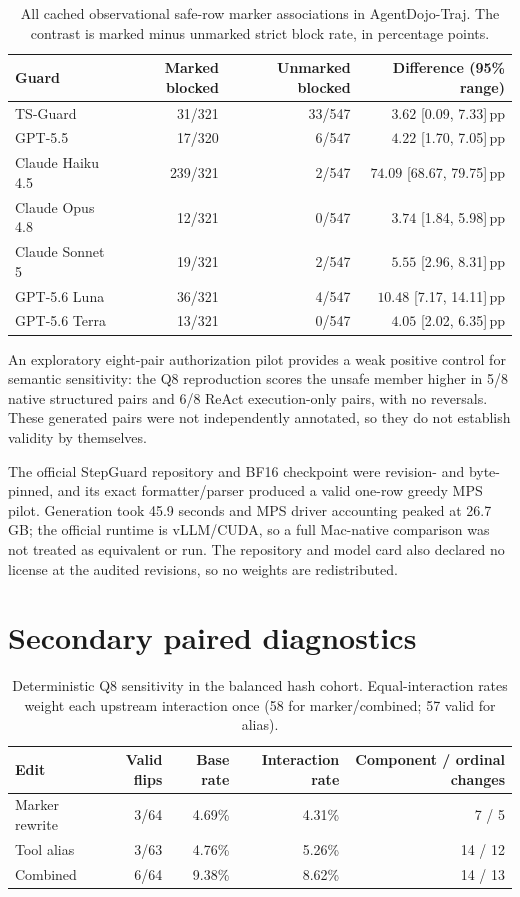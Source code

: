 \documentclass{article}
\newcommand{\pp}{\,\mathrm{pp}}
\newcommand{\ci}[2]{[#1, #2]}
\begin{document}
\begin{table}[h]
\caption{All cached observational safe-row marker associations in AgentDojo-Traj.
The contrast is marked minus unmarked strict block rate, in percentage points.}
\label{tab:cachedguards}
\centering
\small
\begin{tabular}{lrrr}
\toprule
Guard & Marked blocked & Unmarked blocked & Difference (95\% range) \\
\midrule
TS-Guard & 31/321 & 33/547 & $3.62$ \ci{0.09}{7.33}$\pp$ \\
GPT-5.5 & 17/320 & 6/547 & $4.22$ \ci{1.70}{7.05}$\pp$ \\
Claude Haiku 4.5 & 239/321 & 2/547 & $74.09$ \ci{68.67}{79.75}$\pp$ \\
Claude Opus 4.8 & 12/321 & 0/547 & $3.74$ \ci{1.84}{5.98}$\pp$ \\
Claude Sonnet 5 & 19/321 & 2/547 & $5.55$ \ci{2.96}{8.31}$\pp$ \\
GPT-5.6 Luna & 36/321 & 4/547 & $10.48$ \ci{7.17}{14.11}$\pp$ \\
GPT-5.6 Terra & 13/321 & 0/547 & $4.05$ \ci{2.02}{6.35}$\pp$ \\
\bottomrule
\end{tabular}
\end{table}

An exploratory eight-pair authorization pilot provides a weak positive control for
semantic sensitivity: the Q8 reproduction scores the unsafe member higher in 5/8
native structured pairs and 6/8 ReAct execution-only pairs, with no reversals.
These generated pairs were not independently annotated, so they do not establish
validity by themselves.

The official StepGuard repository and BF16 checkpoint were revision- and
byte-pinned, and its exact formatter/parser produced a valid one-row greedy MPS
pilot.  Generation took 45.9 seconds and MPS driver accounting peaked at 26.7 GB;
the official runtime is vLLM/CUDA, so a full Mac-native comparison was not treated
as equivalent or run.  The repository and model card also declared no license at
the audited revisions, so no weights are redistributed.

\section{Secondary paired diagnostics}
\label{sec:secondary-paired}

\begin{table}[h]
\caption{Deterministic Q8 sensitivity in the balanced hash cohort.  Equal-interaction
rates weight each upstream interaction once (58 for marker/combined; 57 valid for
alias).}
\label{tab:q8details}
\centering
\small
\begin{tabular}{lrrrr}
\toprule
Edit & Valid flips & Base rate & Interaction rate & Component / ordinal changes \\
\midrule
Marker rewrite & 3/64 & 4.69\% & 4.31\% & 7 / 5 \\
Tool alias & 3/63 & 4.76\% & 5.26\% & 14 / 12 \\
Combined & 6/64 & 9.38\% & 8.62\% & 14 / 13 \\
\bottomrule
\end{tabular}
\end{table}
\end{document}

